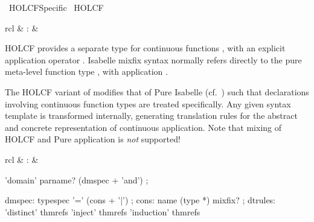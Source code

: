 %
\begin{isabellebody}%
\def\isabellecontext{HOLCF{\isacharunderscore}Specific}%
%
\isadelimtheory
\isanewline
\isanewline
%
\endisadelimtheory
%
\isatagtheory
{}\isamarkupfalse%
\ HOLCF{\isacharunderscore}Specific\isanewline
{}\ HOLCF\isanewline
{}%
\endisatagtheory
{\isafoldtheory}%
%
\isadelimtheory
%
\endisadelimtheory
%
\isamarkuptrue%
%
\isamarkuptrue%
%
\begin{isamarkuptext}%
\begin{matharray}{rcl}
    \mbox{} & : &  \\
  \end{matharray}

  HOLCF provides a separate type for continuous functions \isa{{\isachardoublequote}{\isasymalpha}\ {\isasymrightarrow}\ {\isasymbeta}{\isachardoublequote}}, with an explicit application operator .
  Isabelle mixfix syntax normally refers directly to the pure
  meta-level function type \isa{{\isachardoublequote}{\isasymalpha}\ {\isasymRightarrow}\ {\isasymbeta}{\isachardoublequote}}, with application .

  The HOLCF variant of \mbox{} modifies that of
  Pure Isabelle (cf.\ ) such that declarations
  involving continuous function types are treated specifically.  Any
  given syntax template is transformed internally, generating
  translation rules for the abstract and concrete representation of
  continuous application.  Note that mixing of HOLCF and Pure
  application is \emph{not} supported!%
\end{isamarkuptext}%
\isamarkuptrue%
%
\isamarkuptrue%
%
\begin{isamarkuptext}%
\begin{matharray}{rcl}
    \mbox{} & : &  \\
  \end{matharray}

  \begin{rail}
    'domain' parname? (dmspec + 'and')
    ;

    dmspec: typespec '=' (cons + '|')
    ;
    cons: name (type *) mixfix?
    ;
    dtrules: 'distinct' thmrefs 'inject' thmrefs 'induction' thmrefs
  \end{rail}


\end{isamarkuptext}
\end{isabellebody}
